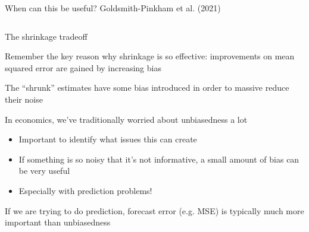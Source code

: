 \documentclass[notes,11pt, aspectratio=169]{beamer}
\newenvironment{wideitemize}{\itemize\addtolength{\itemsep}{10pt}}{\enditemize}
\begin{document}
\begin{frame}{When can this be useful? Goldsmith-Pinkham et al. (2021)}
\begin{columns}[T]
\begin{column}{0.5\textwidth}
\end{column}
\end{columns}
\end{frame}

\begin{frame}{The shrinkage tradeoff}
  \begin{wideitemize}
  \item Remember the key reason why shrinkage is so effective:
    improvements on mean squared error are gained by increasing bias
  \item The ``shrunk'' estimates have some bias introduced in order to
    massive reduce their noise
  \item In economics, we've traditionally worried about unbiasedness a
    lot
    \begin{itemize}
    \item Important to identify what issues this can create
    \item If something is so noisy that it's not informative, a small
      amount of bias can be very useful
    \item Especially with prediction problems!
    \end{itemize}
  \item If we are trying to do prediction, forecast error (e.g. MSE)
    is typically much more important than unbiasedness
  \end{wideitemize}
\end{frame}
\end{document}
